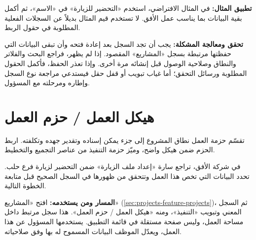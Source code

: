 \textbf{تطبيق المثال:} في المثال الافتراضي، استخدم «التحضير للزيارة» في «الاسم»، ثم أكمل بقية البيانات بما يناسب عمل الأفق. لا تستخدم قيم المثال بديلاً عن السجلات الفعلية المطلوبة في حقول الربط.

\textbf{تحقق ومعالجة المشكلة:} يجب أن تجد السجل بعد إعادة فتحه وأن تبقى البيانات التي حفظتها مرتبطة بسجل «المشاريع» المقصود. إذا لم يظهر، فراجع البحث والفلاتر والنطاق وصلاحية الوصول قبل إنشائه مرة أخرى. وإذا تعذر الحفظ، فأكمل الحقول المطلوبة ورسائل التحقق؛ أما غياب تبويب أو قفل حقل فيستدعي مراجعة نوع السجل وإطاره ومرحلته مع المسؤول.

\clearpage
\section{هيكل العمل / حزم العمل}
\label{sec:projects-feature-wbs-items}

تقسّم حزمة العمل نطاق المشروع إلى جزء يمكن إسناده وتقدير جهده وتكلفته. اربط الحزم ضمن هيكل واضح، وميّز حزمة التنفيذ من عناصر التجميع والتخطيط.

\begin{rcnote}
في شركة الأفق، تراجع سارة «إعداد ملف الزيارة» ضمن التحضير لزيارة فرع حلب. تحدد البيانات التي تخص هذا العمل وتتحقق من ظهورها في السجل الصحيح قبل متابعة الخطوة التالية.
\end{rcnote}

\textbf{المسار ومن يستخدمه:} افتح «المشاريع» (\ref{sec:projects-feature-projects})، ثم السجل المعني وتبويب «التنفيذ»، ومنه «هيكل العمل / حزم العمل». هذا سجل مرتبط داخل مساحة العمل، وليس صفحة مستقلة في قائمة التطبيق. يستخدمها المسؤول عن هذا العمل، ويعدّل الموظف البيانات المسموح له بها وفق صلاحياته.

